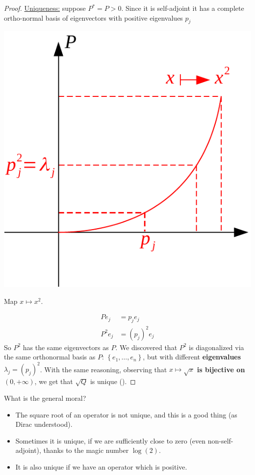 \documentclass[../main.tex]{subfiles}
\begin{document}
\begin{proof}
\underline{Uniqueness:} suppose $P^\ast=P>0$. Since it is self-adjoint it has a complete ortho-normal basis of eigenvectors with positive eigenvalues $p_j$\begin{marginfigure}
	\includegraphics[width=1\linewidth]{images/uniq_polar_dec.pdf}
	\caption{Map $x\mapsto x^2$.}
\end{marginfigure}
\[
\begin{split}
Pe_j&=p_je_j\\
P^2e_j&=\left(p_j\right)^2e_j
\end{split}
\]
So $P^2$ has the same eigenvectors as $P$. We discovered that $P^2$ is diagonalized via the same orthonormal basis as $P$: $\left\{e_1,\dots,e_n\right\}$, but with different \textbf{eigenvalues} $\lambda_j=\left(p_j\right)^2$. With the same reasoning, observing that $x\mapsto \sqrt{x}$ \textbf{is bijective on} $\left(0,+\infty\right)$, we get that $\sqrt{Q}$ is unique ().
\end{proof}
What is the general moral? 
\begin{itemize}
    \item The square root of an operator is not unique, and this is a good thing (as Dirac understood).
    \item Sometimes it is unique, if we are sufficiently close to zero (even non-self-adjoint), thanks to the magic number $\log(2)$.
    \item It is also unique if we have an operator which is positive.
\end{itemize}
\end{document}

